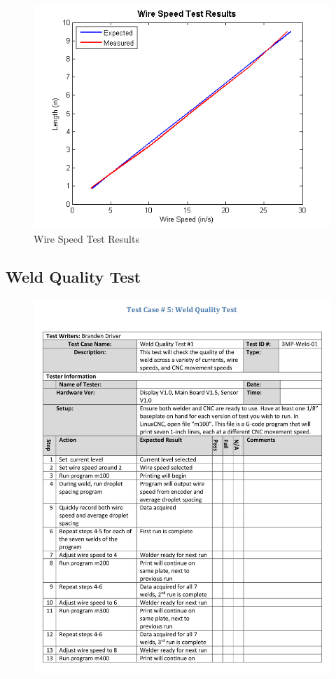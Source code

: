 \documentclass[12pt]{article}
\begin{document}
\begin{figure}[!h]
\centering
\includegraphics[scale=0.95]{speedplot}
\caption{Wire Speed Test Results}
\end{figure}

\clearpage


\subsection{Weld Quality Test}

\begin{figure}[!h]
\centering
\includegraphics[scale=0.9]{tp-5-1}
\end{figure}
\end{document}
